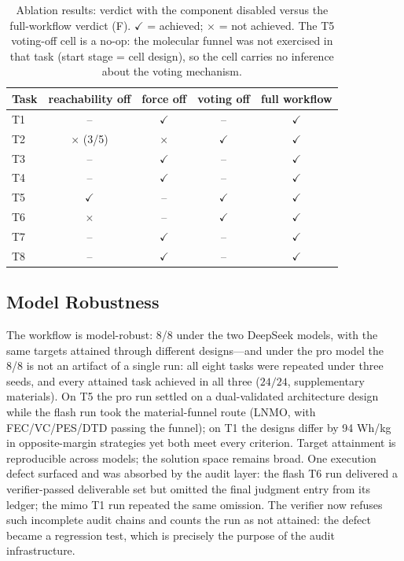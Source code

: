 \begin{table}[!ht]
\centering
\caption{Ablation results: verdict with the component disabled versus the
full-workflow verdict (F). $\checkmark$ = achieved; $\times$ = not
achieved. The T5 voting-off cell is a no-op: the molecular funnel was not
exercised in that task (start stage = cell design), so the cell carries no
inference about the voting mechanism.}
\label{tab:ablation}
\begin{tabular}{lcccc}
\toprule
Task & reachability off & force off & voting off & full workflow \\
\midrule
T1 & -- & $\checkmark$ & -- & $\checkmark$ \\
T2 & $\times$ (3/5) & $\times$ & $\checkmark$ & $\checkmark$ \\
T3 & -- & $\checkmark$ & -- & $\checkmark$ \\
T4 & -- & $\checkmark$ & -- & $\checkmark$ \\
T5 & $\checkmark$ & -- & $\checkmark$ & $\checkmark$ \\
T6 & $\times$ & -- & $\checkmark$ & $\checkmark$ \\
T7 & -- & $\checkmark$ & -- & $\checkmark$ \\
T8 & -- & $\checkmark$ & -- & $\checkmark$ \\
\bottomrule
\end{tabular}
\end{table}

\subsection{Model Robustness}

The workflow is model-robust: 8/8 under the two DeepSeek models, with the same
targets attained through different designs---and under the pro model the
8/8 is not an artifact of a single run: all eight tasks were repeated under
three seeds, and every attained task achieved in all three
($24/24$, supplementary materials). On T5 the pro run settled on a
dual-validated architecture design while the flash run took the
material-funnel route (LNMO, with FEC/VC/PES/DTD passing the funnel); on T1
the designs differ by 94 Wh/kg in opposite-margin strategies yet both meet
every criterion. Target attainment is reproducible across models; the
solution space remains broad. One execution defect surfaced and was absorbed by the audit layer: the
flash T6 run delivered a verifier-passed deliverable set but omitted the
final judgment entry from its ledger; the mimo T1 run repeated the same
omission. The verifier now refuses such incomplete audit chains and counts
the run as not attained: the defect became a regression test, which is
precisely the purpose of the audit infrastructure.

